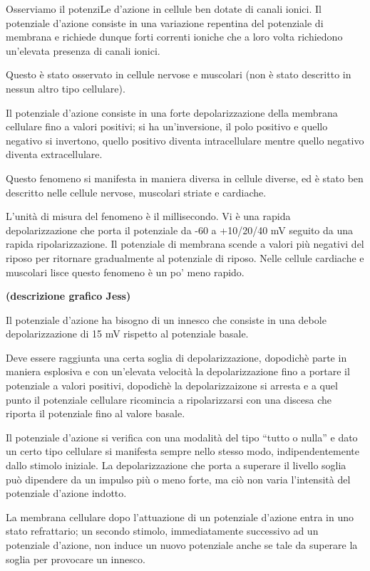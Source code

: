 \documentclass[]{article}
\begin{document}
Osserviamo il potenziLe d'azione in cellule ben dotate di canali ionici.
Il potenziale d'azione consiste in una variazione repentina del
potenziale di membrana e richiede dunque forti correnti ioniche che a
loro volta richiedono un'elevata presenza di canali ionici.

Questo è stato osservato in cellule nervose e muscolari (non è stato
descritto in nessun altro tipo cellulare).

Il potenziale d'azione consiste in una forte depolarizzazione della
membrana cellulare fino a valori positivi; si ha un'inversione, il polo
positivo e quello negativo si invertono, quello positivo diventa
intracellulare mentre quello negativo diventa extracellulare.

Questo fenomeno si manifesta in maniera diversa in cellule diverse, ed è
stato ben descritto nelle cellule nervose, muscolari striate e
cardiache.

L'unità di misura del fenomeno è il millisecondo. Vi è una rapida
depolarizzazione che porta il potenziale da -60 a +10/20/40 mV seguito
da una rapida ripolarizzazione. Il potenziale di membrana scende a
valori più negativi del riposo per ritornare gradualmente al potenziale
di riposo. Nelle cellule cardiache e muscolari lisce questo fenomeno è
un po' meno rapido.

\textbf{(descrizione grafico Jess)}

Il potenziale d'azione ha bisogno di un innesco che consiste in una
debole depolarizzazione di 15 mV rispetto al potenziale basale.

Deve essere raggiunta una certa soglia di depolarizzazione, dopodichè
parte in maniera esplosiva e con un'elevata velocità la depolarizzazione
fino a portare il potenziale a valori positivi, dopodichè la
depolarizzaizone si arresta e a quel punto il potenziale cellulare
ricomincia a ripolarizzarsi con una discesa che riporta il potenziale
fino al valore basale.

Il potenziale d'azione si verifica con una modalità del tipo ``tutto o
nulla'' e dato un certo tipo cellulare si manifesta sempre nello stesso
modo, indipendentemente dallo stimolo iniziale. La depolarizzazione che
porta a superare il livello soglia può dipendere da un impulso più o
meno forte, ma ciò non varia l'intensità del potenziale d'azione
indotto.

La membrana cellulare dopo l'attuazione di un potenziale d'azione entra
in uno stato refrattario; un secondo stimolo, immediatamente successivo
ad un potenziale d'azione, non induce un nuovo potenziale anche se tale
da superare la soglia per provocare un innesco.
\end{document}
